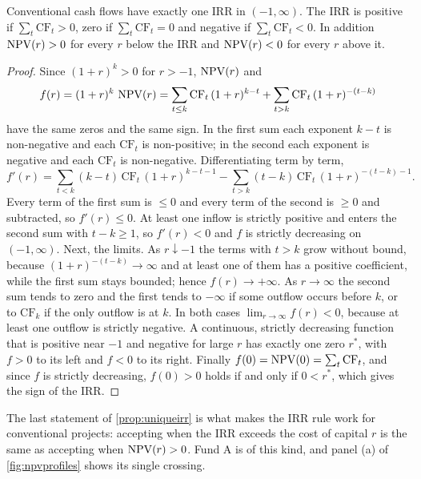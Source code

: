 \begin{chapterrefs}
\begin{proposition}\label{prop:uniqueirr}
Conventional cash flows have exactly one IRR in $(-1,\infty)$. The IRR is positive if
$\sum_t\mathrm{CF}_t>0$, zero if $\sum_t\mathrm{CF}_t=0$ and negative if $\sum_t\mathrm{CF}_t<0$.
In addition $\operatorname{NPV}(r)>0$ for every $r$ below the IRR and $\operatorname{NPV}(r)<0$ for every $r$ above it.
\end{proposition}

\begin{proof}
Since $(1+r)^k>0$ for $r>-1$, $\operatorname{NPV}(r)$ and
\begin{equation}\label{eq:fk}
  f(r) = (1+r)^k\,\operatorname{NPV}(r) = \sum_{t\le k}\mathrm{CF}_t\,(1+r)^{k-t} + \sum_{t>k}\mathrm{CF}_t\,(1+r)^{-(t-k)}
\end{equation}
have the same zeros and the same sign. In the first sum each exponent $k-t$ is non-negative and each
$\mathrm{CF}_t$ is non-positive; in the second each exponent is negative and each $\mathrm{CF}_t$ is
non-negative. Differentiating term by term,
\begin{equation*}
  f'(r) = \sum_{t<k}(k-t)\,\mathrm{CF}_t\,(1+r)^{k-t-1} - \sum_{t>k}(t-k)\,\mathrm{CF}_t\,(1+r)^{-(t-k)-1} .
\end{equation*}
Every term of the first sum is $\le 0$ and every term of the second is $\ge 0$ and subtracted, so
$f'(r)\le 0$. At least one inflow is strictly positive and enters the second sum with $t-k\ge 1$, so
$f'(r)<0$ and $f$ is strictly decreasing on $(-1,\infty)$. Next, the limits. As $r\downarrow -1$ the
terms with $t>k$ grow without bound, because $(1+r)^{-(t-k)}\to\infty$ and at least one of them has a
positive coefficient, while the first sum stays bounded; hence $f(r)\to+\infty$. As $r\to\infty$ the
second sum tends to zero and the first tends to $-\infty$ if some outflow occurs before $k$, or to
$\mathrm{CF}_k$ if the only outflow is at $k$. In both cases $\lim_{r\to\infty}f(r)<0$, because at least one
outflow is strictly negative. A continuous, strictly decreasing function that is positive near $-1$ and
negative for large $r$ has exactly one zero $r^\ast$, with $f>0$ to its left and $f<0$ to its right. Finally
$f(0)=\operatorname{NPV}(0)=\sum_t\mathrm{CF}_t$, and since $f$ is strictly decreasing, $f(0)>0$ holds if and only if
$0<r^\ast$, which gives the sign of the IRR.
\end{proof}

The last statement of \cref{prop:uniqueirr} is what makes the IRR rule work for conventional
projects: accepting when the IRR exceeds the cost of capital $r$ is the same as accepting when
$\operatorname{NPV}(r)>0$. Fund A is of this kind, and panel (a) of \cref{fig:npvprofiles} shows its single crossing.


\end{chapterrefs}
